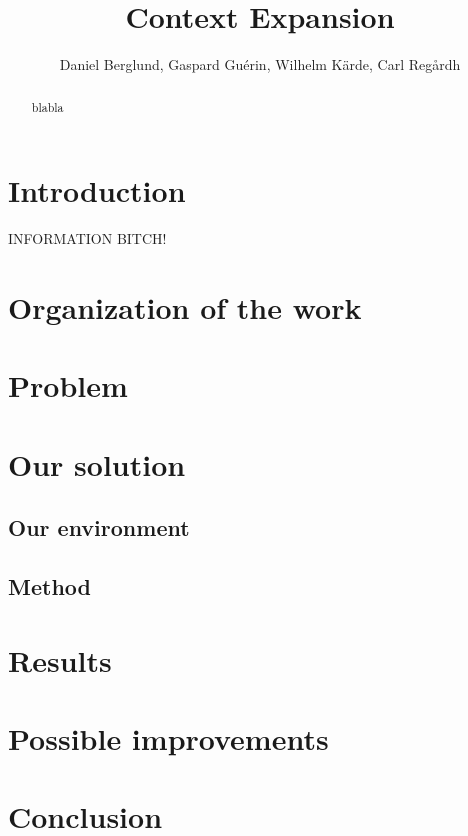 \documentclass[10pt,a4paper]{article}
\title{Context Expansion}
\author{Daniel Berglund, Gaspard Gu\'erin, Wilhelm K\"arde, Carl Reg\aa rdh}
\begin{document}
\maketitle

\newpage
\begin{abstract}
blabla

\end{abstract}

\tableofcontents

\newpage
\section{Introduction}
INFORMATION BITCH!

\section{Organization of the work}

\section{Problem}

\section{Our solution}
\subsection{Our environment}
\subsection{Method}

\section{Results}

\section{Possible improvements}

\section{Conclusion}

\newpage
%
%
\end{document}
